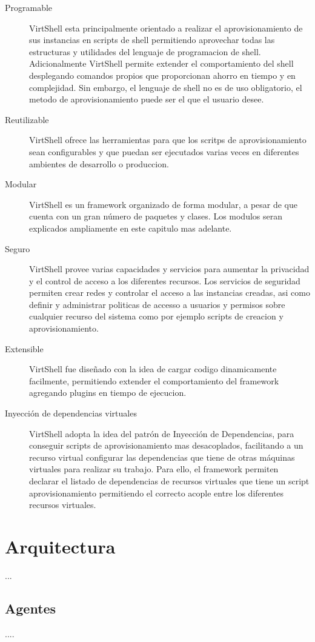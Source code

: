 \begin{description}
\item [Programable] VirtShell esta principalmente orientado a realizar el aprovisionamiento de sus instancias en scripts de shell permitiendo aprovechar todas las estructuras y utilidades del lenguaje de programacion de shell. Adicionalmente VirtShell permite extender el comportamiento del shell desplegando comandos propios que proporcionan ahorro en tiempo y en complejidad. Sin embargo, el lenguaje de shell no es de uso obligatorio, el  metodo de aprovisionamiento puede ser el que el usuario desee. 
\item [Reutilizable] VirtShell ofrece las herramientas para que los scritps de aprovisionamiento sean configurables y que puedan ser ejecutados varias veces en diferentes ambientes de desarrollo o produccion.
\item [Modular] VirtShell es un framework organizado de forma modular, a pesar de que cuenta con un gran número de paquetes y clases. Los modulos seran explicados ampliamente en este capitulo mas adelante.
\item [Seguro] VirtShell provee varias capacidades y servicios para aumentar la privacidad y el control de acceso a los diferentes recursos. Los servicios de seguridad permiten crear redes y controlar el acceso a las instancias creadas, asi como definir y administrar politicas de accesso a usuarios y permisos sobre cualquier recurso del sistema como por ejemplo scripts de creacion y aprovisionamiento.
\item [Extensible] VirtShell fue diseñado con la idea de cargar codigo dinamicamente facilmente, permitiendo extender el comportamiento del framework agregando plugins en tiempo de ejecucion. 
\item [Inyección de dependencias virtuales] VirtShell adopta la idea del patrón de Inyección de Dependencias, para conseguir scripts de aprovisionamiento mas desacoplados, facilitando a un recurso virtual configurar las dependencias que tiene de otras máquinas virtuales para realizar su trabajo. Para ello, el framework permiten declarar el listado de dependencias de recursos virtuales que tiene un script aprovisionamiento permitiendo el correcto acople entre los diferentes recursos virtuales. 
\end{description}

\section{Arquitectura}
...

\subsection{Agentes}
....

